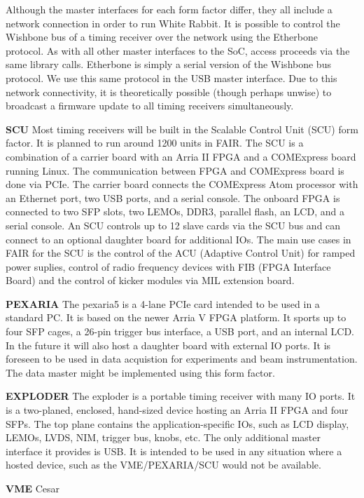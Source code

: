Although the master interfaces for each form factor differ,
they all include a network connection in order to run White Rabbit.
It is possible to control the Wishbone bus of a timing receiver over
the network using the Etherbone protocol.
As with all other master interfaces to the SoC,
access proceeds via the same library calls.
Etherbone is simply a serial version of the Wishbone bus protocol.
We use this same protocol in the USB master interface.
Due to this network connectivity,
it is theoretically possible (though perhaps unwise)
to broadcast a firmware update to all timing receivers simultaneously.

\textbf{SCU}
Most timing receivers will be built in the 
Scalable Control Unit (SCU) form factor.
It is planned to run around 1200 units in FAIR.
The SCU is a combination of a carrier board with an Arria II FPGA and a
COMExpress board running Linux.
The communication between FPGA and COMExpress board is done via PCIe.
The carrier board connects the COMExpress Atom processor with
an Ethernet port, two USB ports, and a serial console.
The onboard FPGA is connected to two SFP slots, two LEMOs, DDR3, 
parallel flash, an LCD, and a serial console.
An SCU controls up to 12 slave cards via the SCU bus
and can connect to an optional daughter board for additional IOs.
The main use cases in FAIR for the SCU is the control of the ACU
(Adaptive Control Unit) for ramped power suplies,
control of radio frequency devices with FIB (FPGA Interface Board) and
the control of kicker modules via MIL extension board.

\textbf{PEXARIA}
The pexaria5 is a 4-lane PCIe card intended to be used in a standard PC.
It is based on the newer Arria V FPGA platform.
It sports up to four SFP cages, a 26-pin trigger bus interface,
a USB port, and an internal LCD.
In the future it will also host a daughter board with external IO
ports.
It is foreseen to be used in data acquistion for experiments
and beam instrumentation.
The data master might be implemented using this form factor.

\textbf{EXPLODER}
The exploder is a portable timing receiver with many IO ports.
It is a two-planed, enclosed, hand-sized device 
hosting an Arria II FPGA and four SFPs.
The top plane contains the application-specific IOs,
such as LCD display, LEMOs, LVDS, NIM, trigger bus, knobs, etc.
The only additional master interface it provides is USB.
It is intended to be used in any situation where a hosted device,
such as the VME/PEXARIA/SCU would not be available.

\textbf{VME}
Cesar


